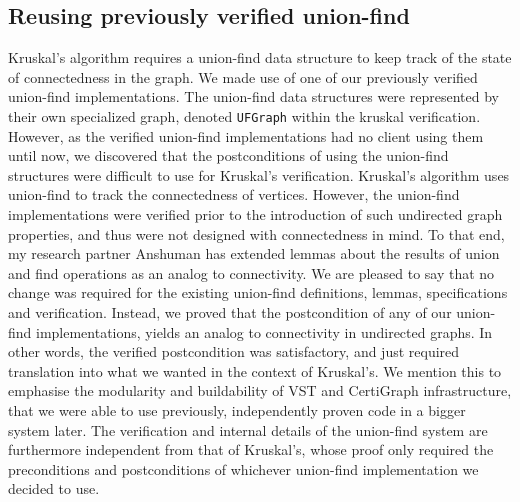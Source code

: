 \subsection{Reusing previously verified union-find} %
Kruskal's algorithm requires a union-find data structure to keep track of the state of connectedness in the graph. We made use of one of our previously verified union-find implementations. The union-find data structures were represented by their own specialized graph, denoted \texttt{UFGraph} within the kruskal verification.
\newline\newline
However, as the verified union-find implementations had no client using them until now, we discovered that the postconditions of using the union-find structures were difficult to use for Kruskal's verification. Kruskal's algorithm uses union-find to track the connectedness of vertices. However, the union-find implementations were verified prior to the introduction of such undirected graph properties, and thus were not designed with connectedness in mind. To that end, my research partner Anshuman has extended lemmas about the results of union and find operations as an analog to connectivity.
\newline\newline
We are pleased to say that no change was required for the existing union-find definitions, lemmas, specifications and verification. Instead, we proved that the postcondition of any of our union-find implementations, yields an analog to connectivity in undirected graphs. In other words, the verified postcondition was satisfactory, and just required translation into what we wanted in the context of Kruskal's.
\newline\newline
We mention this to emphasise the modularity and buildability of VST and CertiGraph infrastructure, that we were able to use previously, independently proven code in a bigger system later. The verification and internal details of the union-find system are furthermore independent from that of Kruskal's, whose proof only required the preconditions and postconditions of whichever union-find implementation we decided to use.